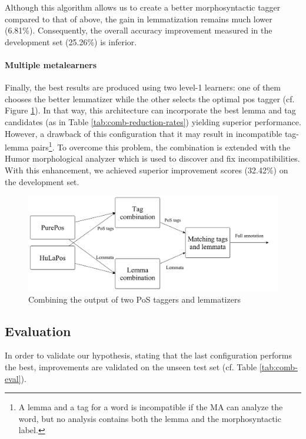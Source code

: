 Although this algorithm allows us to create a better morphosyntactic tagger compared to that of above, the gain in lemmatization remains much lower (6.81\%).
Consequently, the overall accuracy improvement measured in the development set (25.26\%) is inferior.

\paragraph{Multiple metalearners}

Finally, the best results are produced using two level-1 learners: one of them chooses the better lemmatizer while the other selects the optimal \acrshort{pos} tagger (cf. Figure \ref{fig:comb3}).
In that  way, this architecture can incorporate the best lemma and tag candidates (as in Table \ref{tab:comb-reduction-rates}) yielding superior performance.
However, a drawback of this configuration that it may result in incompatible tag-lemma pairs\footnote{ A lemma and a tag for a word is incompatible if the MA can analyze the word, but no analysis contains both the lemma and the morphosyntactic label.}.
To overcome this problem, the combination is extended with the Humor morphological analyzer which is used to discover and fix incompatibilities.
With this enhancement, we achieved superior improvement scores (32.42\%) on the development set.

\begin{figure}[H]
  \centering
  \includegraphics[scale=0.2]{MorphTagging/comb3.png} 
  \caption{Combining the output of two PoS taggers and lemmatizers}
  \label{fig:comb3}
\end{figure}

\subsection{Evaluation}

In order to validate our hypothesis, stating that the last configuration performs the best, improvements are validated on the unseen test set (cf.
Table \ref{tab:comb-eval}).


